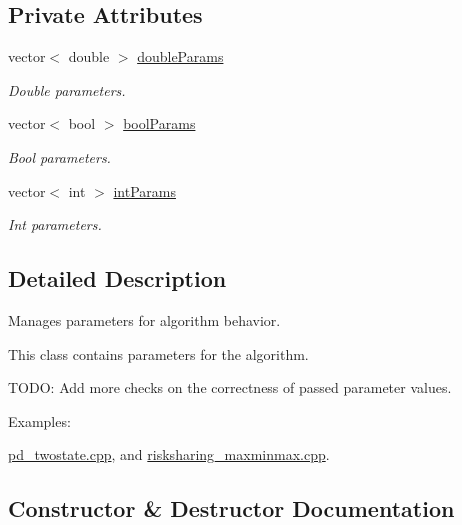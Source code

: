 \subsection*{Private Attributes}
\begin{DoxyCompactItemize}
\item 
\mbox{\label{classSGEnv_af5b5de418e3c1a84ee8a6af8ac4e4b9b}} 
vector$<$ double $>$ \hyperlink{classSGEnv_af5b5de418e3c1a84ee8a6af8ac4e4b9b}{double\+Params}
\begin{DoxyCompactList}\small\item\em Double parameters. \end{DoxyCompactList}\item 
\mbox{\label{classSGEnv_a2a4034a806454ea25a88f2fcf9610c50}} 
vector$<$ bool $>$ \hyperlink{classSGEnv_a2a4034a806454ea25a88f2fcf9610c50}{bool\+Params}
\begin{DoxyCompactList}\small\item\em Bool parameters. \end{DoxyCompactList}\item 
\mbox{\label{classSGEnv_a2b0bb12821ee9147615be6e887f93ed1}} 
vector$<$ int $>$ \hyperlink{classSGEnv_a2b0bb12821ee9147615be6e887f93ed1}{int\+Params}
\begin{DoxyCompactList}\small\item\em Int parameters. \end{DoxyCompactList}\end{DoxyCompactItemize}


\subsection{Detailed Description}
Manages parameters for algorithm behavior. 

This class contains parameters for the algorithm.

T\+O\+DO\+: Add more checks on the correctness of passed parameter values. \begin{Desc}
\item[Examples\+: ]\par
\hyperlink{pd_twostate_8cpp-example}{pd\+\_\+twostate.\+cpp}, and \hyperlink{risksharing_maxminmax_8cpp-example}{risksharing\+\_\+maxminmax.\+cpp}.\end{Desc}


\subsection{Constructor \& Destructor Documentation}
\mbox{\label{classSGEnv_ac7fe265f0baba4e498c36bd67a0bbc97}} 
